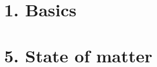 \documentclass{cheatsheet}
\author{Noa Sendlhofer \& Cristian Leser \\ nsendlhofer \& cleser}
\begin{document}
\section{1. Basics}
	
\section{5. State of matter}
	
\end{document}
